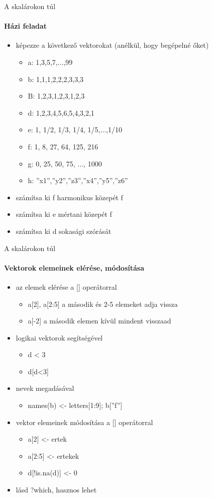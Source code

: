 \documentclass[10pt]{beamer}
\begin{document}
\begin{frame}{A skalárokon túl}
\framesubtitle{Házi feladat}
\begin{itemize}
\item képezze a következő vektorokat (anélkül, hogy begépelné őket)
\begin{itemize}
\item a: 1,3,5,7,$\dots$,99
\item b: 1,1,1,2,2,2,3,3,3
\item B: 1,2,3,1,2,3,1,2,3
\item d: 1,2,3,4,5,6,5,4,3,2,1
\item e: 1, 1/2, 1/3, 1/4, 1/5,$\dots$,1/10
\item f: 1, 8, 27, 64, 125, 216
\item g: 0, 25, 50, 75, $\dots$, 1000
\item h: ''x1'',''y2'',''z3'',''x4'',''y5'',''z6'' 
\end{itemize}
\item számítsa ki f harmonikus közepét f
\item számítsa ki e mértani közepét f
\item számítsa ki d sokasági szórását
\end{itemize}
\end{frame}

\begin{frame}{A skalárokon túl}
\framesubtitle{Vektorok elemeinek elérése, módosítása}
\begin{itemize}
\item az elemek elérése a [] operátorral
\begin{itemize}
\item a[2], a[2:5] a második és 2-5 elemeket adja vissza
\item a[-2] a második elemen kívül mindent visszaad
\end{itemize} 
\item logikai vektorok segítségével
\begin{itemize}
\item d < 3
\item d[d<3]
\end{itemize}
\item nevek megadásával
\begin{itemize}
\item names(b) <- letters[1:9]; b[''f'']
\end{itemize}
\item vektor elemeinek módosítása a [] operátorral
\begin{itemize}
\item a[2] <- ertek
\item a[2:5] <- ertekek
\item d[!is.na(d)] <- 0
\end{itemize}
\item lásd ?which, hasznos lehet
\end{itemize}
\end{frame}
\end{document}
